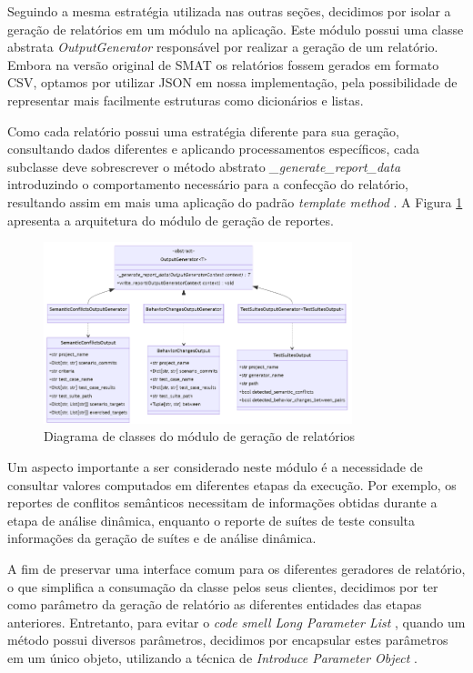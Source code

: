 \documentclass[12pt]{article}
\begin{document}
Seguindo a mesma estratégia utilizada nas outras seções, decidimos por isolar a geração de relatórios em um módulo na aplicação. Este módulo possui uma classe abstrata \textit{OutputGenerator} responsável por realizar a geração de um relatório. Embora na versão original de SMAT os relatórios fossem gerados em formato CSV, optamos por utilizar JSON em nossa implementação, pela possibilidade de representar mais facilmente estruturas como dicionários e listas.

Como cada relatório possui uma estratégia diferente para sua geração, consultando dados diferentes e aplicando processamentos específicos, cada subclasse deve sobrescrever o método abstrato \textit{\_generate\_report\_data} introduzindo o comportamento necessário para a confecção do relatório, resultando assim em mais uma aplicação do padrão \textit{template method} \cite{gof}. A Figura \ref{fig:output} apresenta a arquitetura do módulo de geração de reportes.

\begin{figure}[H]
    \centering
    \includegraphics[width=0.8\textwidth]{output.png}
    \caption{Diagrama de classes do módulo de geração de relatórios}
    \label{fig:output}
\end{figure}

Um aspecto importante a ser considerado neste módulo é a necessidade de consultar valores computados em diferentes etapas da execução. Por exemplo, os reportes de conflitos semânticos necessitam de informações obtidas durante a etapa de análise dinâmica, enquanto o reporte de suítes de teste consulta informações da geração de suítes e de análise dinâmica.

A fim de preservar uma interface comum para os diferentes geradores de relatório, o que simplifica a consumação da classe pelos seus clientes, decidimos por ter como parâmetro da geração de relatório as diferentes entidades das etapas anteriores. Entretanto, para evitar o \textit{code smell Long Parameter List} \cite{fowler2018refactoring}, quando um método possui diversos parâmetros, decidimos por encapsular estes parâmetros em um único objeto, utilizando a técnica de \textit{Introduce Parameter Object} \cite{fowler2018refactoring}.
\end{document}

